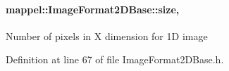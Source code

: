 \paragraph[{\texorpdfstring{size}{size}}]{ mappel\+::\+Image\+Format2\+D\+Base\+::size\hspace{0.3cm}{\ttfamily [protected]}, {\ttfamily [inherited]}}\hypertarget{classmappel_1_1ImageFormat2DBase_a3be77d2aa6ec9f3815322732950c2a60}{}\label{classmappel_1_1ImageFormat2DBase_a3be77d2aa6ec9f3815322732950c2a60}
Number of pixels in X dimension for 1D image 

Definition at line 67 of file Image\+Format2\+D\+Base.\+h.



